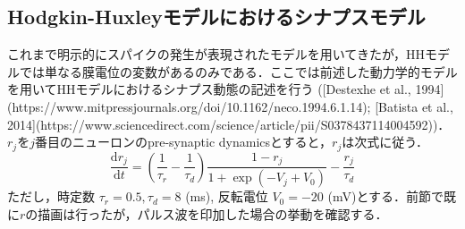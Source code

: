 \subsection{Hodgkin-Huxleyモデルにおけるシナプスモデル}これまで明示的にスパイクの発生が表現されたモデルを用いてきたが，HHモデルでは単なる膜電位の変数があるのみである．ここでは前述した動力学的モデルを用いてHHモデルにおけるシナプス動態の記述を行う ([Destexhe et al., 1994](https://www.mitpressjournals.org/doi/10.1162/neco.1994.6.1.14); [Batista et al., 2014](https://www.sciencedirect.com/science/article/pii/S0378437114004592))．
$r_{j}$を$j$番目のニューロンのpre-synaptic dynamicsとすると，$r_{j}$は次式に従う．
$$
\frac{\mathrm{d} r_{j}}{\mathrm{d} t}=\left(\frac{1}{\tau_{r}}-\frac{1}{\tau_{d}}\right) \frac{1-r_{j}}{1+\exp \left(-V_{j}+V_{0}\right)}-\frac{r_{j}}{\tau_{d}}
$$
ただし，時定数 $\tau_r=0.5, \tau_d = 8$ (ms), 反転電位 $V_0 = -20$ (mV)とする．前節で既に$r$の描画は行ったが，パルス波を印加した場合の挙動を確認する．
